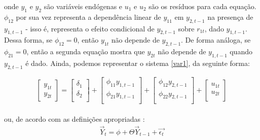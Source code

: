 \noindent
onde $y_1$ e $y_2$ são variáveis endógenas e $u_1$ e $u_2$ são os resíduos para cada equação. $\phi_{12}$ por sua vez representa a dependência linear de $y_{11}$ em $y_{2, t-1}$ na presença de $y_{1, t-1}$ - isso é, representa o efeito condicional de $y_{2, t-1}$ sobre $r_{1t}$, dado $y_{1, t-1}$. Dessa forma, se $\phi_{12} = 0$, então $y_{1t}$ não depende de $y_{2, t-1}$. De forma análoga, se $\phi_{21}=0$, então a segunda equação mostra que $y_{2t}$ não depende de $y_{1, t-1}$ quando $y_{2, t-1}$ é dado. Ainda, podemos representar o sistema \ref{var1}, da seguinte forma:

\[
\begin{bmatrix}
    y_{1t} \\
    y_{2t}
\end{bmatrix}
=
\begin{bmatrix}
    \delta_1 \\
    \delta_2 \\
\end{bmatrix}
+
\begin{bmatrix}
    \phi_{11}y_{1,t-1} \\
    \phi_{21}y_{1,t-1} \\
\end{bmatrix}
+
\begin{bmatrix}
    \phi_{12}y_{2,t-1} \\
    \phi_{22}y_{2,t-1} \\
\end{bmatrix}
+
\begin{bmatrix}
    u_{1t} \\
    u_{2t} \\
\end{bmatrix}
\]\\

\noindent
ou, de acordo com as definições apropriadas \cite[p.322]{verbeek2008guide}:
\begin{align*}
    \Vec{Y}_t = \phi + \Theta \Vec{Y}_{t-1} + \Vec{\epsilon_t} 
\end{align*}

